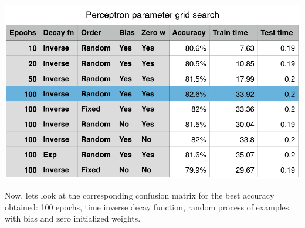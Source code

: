 \documentclass[11pt]{article}
\begin{document}
\begin{center}
\includegraphics[scale=0.7]{part1.1/params.png}
\end{center}

Now, lets look at the corresponding confusion matrix for the best accuracy obtained: 100 epochs, time inverse decay function, random process of examples, with bias and zero initialized weights.
\end{document}
